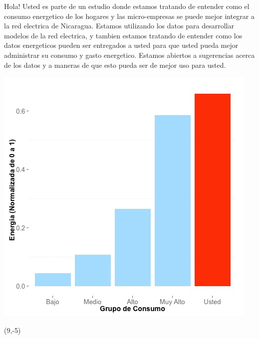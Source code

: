 \documentclass{article}\usepackage[]{graphicx}\usepackage[]{color}
\newenvironment{knitrout}{}{} %
\begin{document}
Hola! Usted es parte de un estudio donde estamos tratando de entender como el consumo energetico de los hogares y las micro-empresas se puede mejor integrar a la red electrica de Nicaragua. Estamos utilizando los datos para desarrollar modelos de la red electrica, y tambien estamos tratando de entender como los datos energeticos pueden ser entregados a usted para que usted pueda mejor administrar su consumo y gasto energetico.  Estamos abiertos a sugerencias acerca de los datos y a maneras de que esto pueda ser de mejor uso para usted.

\begin{knitrout}
\color{fgcolor}
\includegraphics[scale=0.65]{figure/A1_neighbor_plot} 
\end{knitrout}

 \begin{textblock}{1}(9,-5)
\begin{minipage}{20em}
\begingroup

\endgroup
\end{minipage}
\end{textblock}
\end{document}
